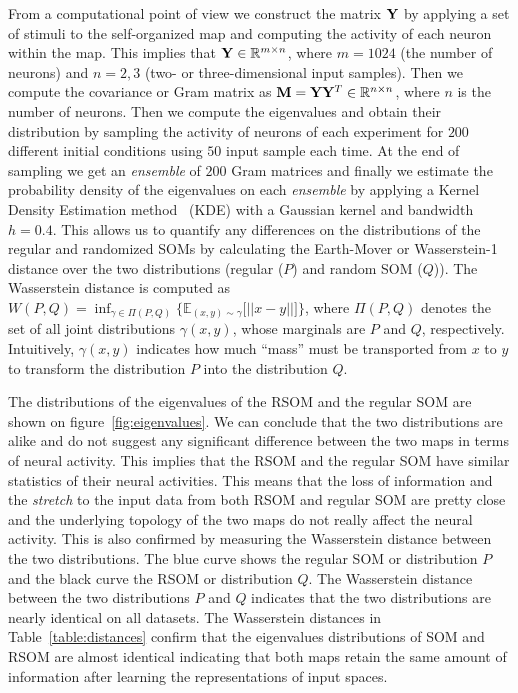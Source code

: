 From a computational point of view we construct the matrix ${\bf Y}$ by applying a set of stimuli to the self-organized map and computing the activity of each neuron within the map. This implies that ${\bf Y} \in \mathbb{R}^{m \times n}$, where $m=1024$ (the number of neurons) and $n={2, 3}$ (two- or three-dimensional input samples). Then we compute the covariance or Gram matrix as ${\bf M} = {\bf Y}{\bf Y}^T \in \mathbb{R}^{n \times n}$, where $n$ is the number of neurons. Then we compute the eigenvalues and obtain their distribution by sampling the activity of neurons of each experiment for $200$ different initial conditions using $50$ input sample each time. At the end of sampling we get an \emph{ensemble} of $200$ Gram matrices and finally we estimate the probability density of the eigenvalues on each \emph{ensemble} by applying a Kernel Density Estimation method~\citep{Parzen:1962} (KDE) with a Gaussian kernel and bandwidth $h=0.4$. This allows us to quantify any differences on the distributions of the regular and randomized SOMs by calculating the Earth-Mover or Wasserstein-1 distance over the two distributions (regular ($P$) and random SOM ($Q$)). The Wasserstein distance is computed as $W(P, Q) = \inf_{\gamma \in \Pi(P, Q)}\{\mathbb{E}_{(x, y) \sim \gamma}\Big[||x - y||\Big]\}$, where $\Pi(P, Q)$ denotes the set of all joint distributions $\gamma (x, y)$, whose marginals are $P$ and $Q$, respectively. Intuitively, $\gamma (x,y)$ indicates  how  much ``mass'' must be transported from $x$ to $y$ to transform the distribution $P$ into the distribution $Q$. 

The distributions of the eigenvalues of the RSOM and the regular SOM are shown on figure~\ref{fig:eigenvalues}. We can conclude that the two distributions are alike and do not suggest any significant difference between the two maps in terms of neural activity. This implies that the RSOM and the regular SOM have similar statistics of their neural activities. This means that the loss of information and the \emph{stretch} to the input data from both RSOM and regular SOM are pretty close and the underlying  topology of the two maps do not really affect the neural activity. This is also confirmed
by measuring the Wasserstein distance between the two distributions. The blue curve shows the regular SOM or distribution $P$ and the black curve the RSOM or distribution $Q$. The Wasserstein distance between the two distributions $P$ and $Q$ indicates that the two distributions are nearly identical on all datasets. The Wasserstein distances in Table~\ref{table:distances}
confirm that the eigenvalues distributions of SOM and RSOM are almost identical indicating that both maps retain the
same amount of information after learning the representations of input spaces.

